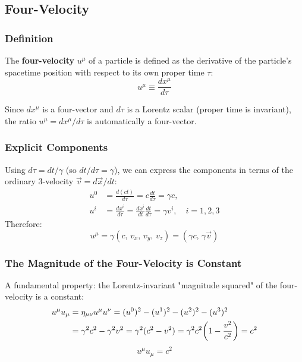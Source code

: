 \subsection{Four-Velocity}

\subsubsection*{Definition}

The \textbf{four-velocity} $u^\mu$ of a particle is defined as the derivative of the particle's spacetime position with respect to its own proper time $\tau$:
\begin{equation}\label{eq:lec05:four-velocity-definition}
    u^\mu \equiv \frac{dx^\mu}{d\tau}
\end{equation}

Since $dx^\mu$ is a four-vector and $d\tau$ is a Lorentz scalar (proper time is invariant), the ratio $u^\mu = dx^\mu / d\tau$ is automatically a four-vector.

\subsubsection*{Explicit Components}

Using $d\tau = dt/\gamma$ (so $dt/d\tau = \gamma$), we can express the components in terms of the ordinary 3-velocity $\vec{v} = d\vec{x}/dt$:
\begin{align}
    u^0 &= \frac{d(ct)}{d\tau} = c\frac{dt}{d\tau} = \gamma c, \label{eq:lec05:u0}\\[6pt]
    u^i &= \frac{dx^i}{d\tau} = \frac{dx^i}{dt}\frac{dt}{d\tau} = \gamma v^i, \quad i = 1,2,3
    \label{eq:lec05:ui}
\end{align}
Therefore:
\begin{equation}\label{eq:lec05:four-velocity-components}
    \boxed{u^\mu = \gamma(c,\, v_x,\, v_y,\, v_z) = (\gamma c,\, \gamma\vec{v})}
\end{equation}

\subsubsection*{The Magnitude of the Four-Velocity is Constant}

A fundamental property: the Lorentz-invariant "magnitude squared" of the four-velocity is a constant:
\begin{align}
    u^\mu u_\mu &= \eta_{\mu\nu} u^\mu u^\nu = (u^0)^2 - (u^1)^2 - (u^2)^2 - (u^3)^2 \notag \\
    &= \gamma^2 c^2 - \gamma^2 v^2 = \gamma^2(c^2 - v^2) = \gamma^2 c^2\!\left(1-\frac{v^2}{c^2}\right) = c^2
    \label{eq:lec05:four-velocity-norm-derivation}
\end{align}
\begin{equation}\label{eq:lec05:four-velocity-norm}
    \boxed{u^\mu u_\mu = c^2}
\end{equation}

